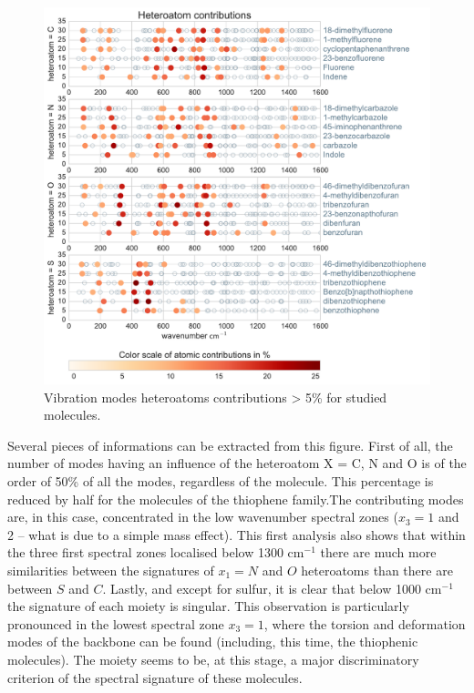 	
	\begin{figure}[H]
		\begin{center}
			\includegraphics[scale=0.7]{image/P22}
		\end{center}
		\caption{Vibration modes heteroatoms contributions > 5\% for studied molecules.} \label{figP2-2}
	\end{figure}
	
Several pieces of informations can be extracted from this figure. First of all, the number of modes having an influence of the heteroatom X = C, N and O is of the order of 50\% of all the modes, regardless of the molecule. This percentage is reduced by half for the molecules of the thiophene family.The contributing modes are, in this case, concentrated in the low wavenumber spectral zones ($x_3=1$ and 2 – what is due to a simple mass effect). This first analysis also shows that within the three first spectral zones localised below 1300 cm$^{-1}$ there are much more similarities between the signatures of $x_1=N$ and $O$ heteroatoms than there are between $S$ and $C$. Lastly, and except for sulfur, it is clear that below 1000 cm$^{-1}$ the signature of each moiety is singular. This observation is particularly pronounced in the lowest spectral zone $x_3=1$, where the torsion and deformation modes of the backbone can be found (including, this time, the thiophenic molecules). The moiety seems to be, at this stage, a major discriminatory criterion of the spectral signature of these molecules. 
	
